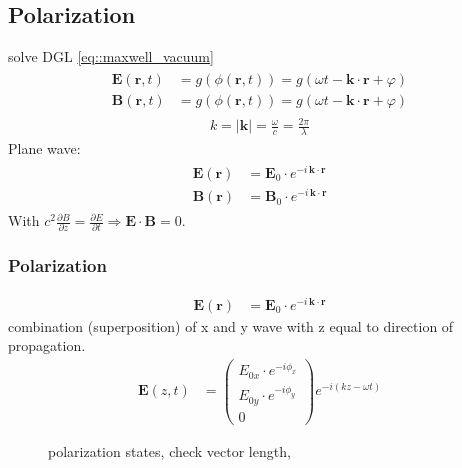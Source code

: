 \subsection{Polarization}
% 
solve DGL \ref{eq::maxwell_vacuum}
% 
\begin{align}
\begin{split} \label{eq::dgl_solution}
  \mathbf{E}( \mathbf{r}, t ) &= g(\phi( \mathbf{r}, t )) = g( \omega t - \mathbf{k} \cdot \mathbf{r} + \varphi)\\
  \mathbf{B}( \mathbf{r}, t ) &= g(\phi( \mathbf{r}, t )) = g( \omega t - \mathbf{k} \cdot \mathbf{r} + \varphi )
\end{split}
\end{align}
% 
\begin{align}
k = \mathopen| \mathbf{k} \mathclose| = \frac{\omega}{c} =  \frac{2 \pi}{\lambda}
\end{align}
% 
Plane wave:
\begin{align}
\begin{split} \label{eq::plane_wave}
\mathbf{E}(\mathbf{r}) &= \mathbf{E}_0 \cdot e^{ -i \, \mathbf{k} \cdot \mathbf{r} }\\
 \mathbf{B}(\mathbf{r}) &= \mathbf{B}_0 \cdot e^{ -i \, \mathbf{k} \cdot \mathbf{r} }
\end{split}
\end{align}
% 
With $c^2  \frac{\partial B} {\partial z} = \frac{\partial E}{\partial t} \Rightarrow \mathbf{E} \cdot \mathbf{B} = 0$.
% 
\subsubsection{Polarization}
% 
\begin{align}
\mathbf{E}(\mathbf{r}) &= \mathbf{E}_0 \cdot e^{ -i \, \mathbf{k} \cdot \mathbf{r}}
\end{align}
% 
combination (superposition) of x and y wave with z equal to direction of propagation.
\begin{align}
\mathbf{E}(z,t) &= \begin{pmatrix} E_{0x} \cdot e^{ -i \phi_x } \\ E_{0y} \cdot e^{ -i \phi_y } \\ 0 \end{pmatrix}
e^{ -i (kz - \omega t)}
\end{align}
%
\begin{figure}[!t]
\centering
\tikzset{external/export=false}

\caption{polarization states, check vector length,} 
\end{figure}
%
